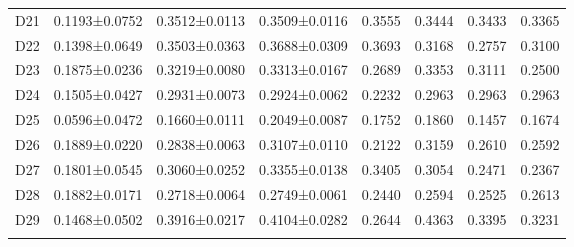 \begin{table*}[h]
\begin{tabular}{llllllll}
D21&0.1193±0.0752&0.3512±0.0113&0.3509±0.0116&0.3555&0.3444&0.3433&0.3365\\
D22&0.1398±0.0649&0.3503±0.0363&0.3688±0.0309&0.3693&0.3168&0.2757&0.3100\\
D23&0.1875±0.0236&0.3219±0.0080&0.3313±0.0167&0.2689&0.3353&0.3111&0.2500\\
D24&0.1505±0.0427&0.2931±0.0073&0.2924±0.0062&0.2232&0.2963&0.2963&0.2963\\
D25&0.0596±0.0472&0.1660±0.0111&0.2049±0.0087&0.1752&0.1860&0.1457&0.1674\\
D26&0.1889±0.0220&0.2838±0.0063&0.3107±0.0110&0.2122&0.3159&0.2610&0.2592\\
D27&0.1801±0.0545&0.3060±0.0252&0.3355±0.0138&0.3405&0.3054&0.2471&0.2367\\
D28&0.1882±0.0171&0.2718±0.0064&0.2749±0.0061&0.2440&0.2594&0.2525&0.2613\\
D29&0.1468±0.0502&0.3916±0.0217&0.4104±0.0282&0.2644&0.4363&0.3395&0.3231\\
\noalign{\smallskip}\hline
\end{tabular}
\end{table*}